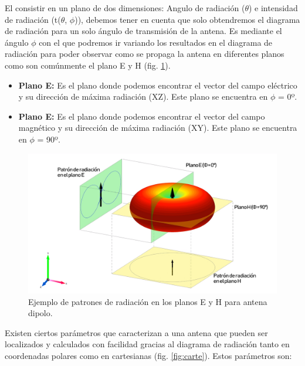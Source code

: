 \par El consistir en un plano de dos dimensiones: Angulo de radiación ($\theta$) e intensidad de radiación (t($\theta $, $\phi $)), debemos tener en cuenta que solo obtendremos el diagrama de radiación para un solo ángulo de transmisión de la antena. Es mediante el ángulo $\phi $ con el que podremos ir variando los resultados en el diagrama de radiación para poder observar como se propaga la antena en diferentes planos como son comúnmente el plano E y H (fig. \ref{fig:pattern}).

\begin{itemize}
\item \textbf{Plano E: }Es el plano donde podemos encontrar el vector del campo eléctrico y su dirección de máxima radiación (XZ). Este plano se encuentra en $\phi $ = 0º. 

\item \textbf{Plano E: }Es el plano donde podemos encontrar el vector del campo magnético y su dirección de máxima radiación (XY). Este plano se encuentra en $\phi $ = 90º.
\end{itemize}

\begin{figure}[h]
    \centering
        \includegraphics[width=15cm]{archivos/radiacion/pattern2}
        \caption{Ejemplo de patrones de radiación en los planos E y H para antena dipolo. \citep{Yavuz2015}}
        \label{fig:pattern}
\end{figure}

\par Existen ciertos parámetros que caracterizan a una antena que pueden ser localizados y calculados con facilidad gracias al diagrama de radiación tanto en coordenadas polares como en cartesianas (fig. \ref{fig:carte}). Estos parámetros son:

